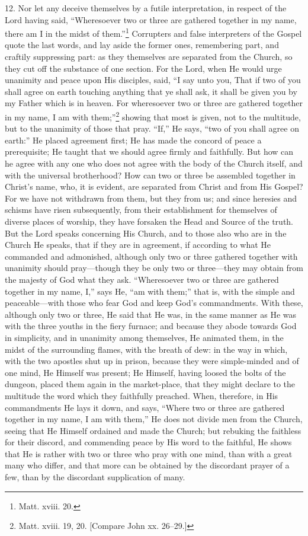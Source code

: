 12. Nor let any deceive themselves by a futile interpretation, in respect of the Lord having said, “Wheresoever two or three are gathered together in my name, there am I in the midst of them.”\footnote{Matt. xviii. 20.} Corrupters and false interpreters of the Gospel quote the last words, and lay aside the former ones, remembering part, and craftily suppressing part: as they themselves are separated from the Church, so they cut off the substance of one section. For the Lord, when He would urge unanimity and peace upon His disciples, said, “I say unto you, That if two of you shall agree on earth touching anything that ye shall ask, it shall be given you by my Father which is in heaven. For wheresoever two or three are gathered together in my name, I am with them;”\footnote{Matt. xviii. 19, 20. [Compare John xx. 26–29.]} showing that most is given, not to the multitude, but to the unanimity of those that pray. “If,” He says, “two of you shall agree on earth:” He placed agreement first; He has made the concord of peace a prerequisite; He taught that we should agree firmly and faithfully. But how can he agree with any one who does not agree with the body of the Church itself, and with the universal brotherhood? How can two or three be assembled together in Christ’s name, who, it is evident, are separated from Christ and from His Gospel? For we have not withdrawn from them, but they from us; and since heresies and schisms have risen subsequently, from their establishment for themselves of diverse places of worship, they have forsaken the Head and Source of the truth. But the Lord speaks concerning His Church, and to those also who are in the Church He speaks, that if they are in agreement, if according to what He commanded and admonished, although only two or three gathered together with unanimity should pray—though they be only two or three—they may obtain from the majesty of God what they ask. “Wheresoever two or three are gathered together in my name, I,” says He, “am with them;” that is, with the simple and peaceable—with those who fear God and keep God’s commandments. With these, although only two or three, He said that He was, in the same manner as He was with the three youths in the fiery furnace; and because they abode towards God in simplicity, and in unanimity among themselves, He animated them, in the midst of the surrounding flames, with the breath of dew: in the way in which, with the two apostles shut up in prison, because they were simple-minded and of one mind, He Himself was present; He Himself, having loosed the bolts of the dungeon, placed them again in the market-place, that they might declare to the multitude the word which they faithfully preached. When, therefore, in His commandments He lays it down, and says, “Where two or three are gathered together in my name, I am with them,” He does not divide men from the Church, seeing that He Himself ordained and made the Church; but rebuking the faithless for their discord, and commending peace by His word to the faithful, He shows that He is rather with two or three who pray with one mind, than with a great many who differ, and that more can be obtained by the discordant prayer of a few, than by the discordant supplication of many.

